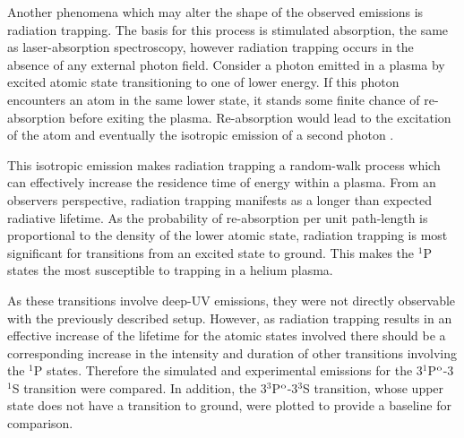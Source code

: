 Another phenomena which may alter the shape of the observed emissions is
radiation trapping. The basis for this process is stimulated absorption, the
same as laser-absorption spectroscopy, however radiation trapping occurs in the
absence of any external photon field. Consider a photon emitted in a plasma by
excited atomic state transitioning to one of lower energy. If this photon
encounters an atom in the same lower state, it stands some finite chance of
re-absorption before exiting the plasma. Re-absorption would lead to the
excitation of the atom and eventually the isotropic emission of a second photon
\cite{Kunze2009}.

This isotropic emission makes radiation trapping a random-walk process which can
effectively increase the residence time of energy within a plasma. From an
observers perspective, radiation trapping manifests as a longer than expected
radiative lifetime. As the probability of re-absorption per unit path-length is
proportional to the density of the lower atomic state, radiation trapping is
most significant for transitions from an excited state to ground. This makes the
$^1$P states the most susceptible to trapping in a helium plasma.

As these transitions involve deep-UV emissions, they were not directly
observable with the previously described setup. However, as radiation trapping
results in an effective increase of the lifetime for the atomic states involved
there should be a corresponding increase in the intensity and duration of other
transitions involving the $^1$P states. Therefore the simulated and experimental
emissions for the 3$^1$P$^\mathrm{o}$-3$^1$S transition were compared. In addition, the
3$^3$P$^\mathrm{o}$-3$^3$S transition, whose upper state does not have a transition to
ground, were plotted to provide a baseline for comparison.

